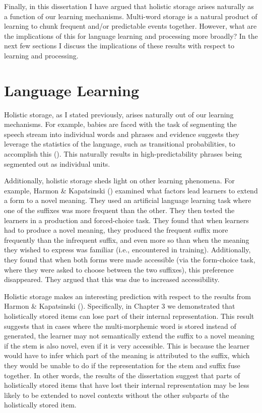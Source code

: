 \documentclass[
  12pt,
  letterpaper,
]{scrreport}
\begin{document}
Finally, in this dissertation I have argued that holistic storage arises
naturally as a function of our learning mechanisms. Multi-word storage
is a natural product of learning to chunk frequent and/or predictable
events together. However, what are the implications of this for language
learning and processing more broadly? In the next few sections I discuss
the implications of these results with respect to learning and
processing.

\section{Language Learning}\label{language-learning}

Holistic storage, as I stated previously, arises naturally out of our
learning mechanisms. For example, babies are faced with the task of
segmenting the speech stream into individual words and phrases and
evidence suggests they leverage the statistics of the language, such as
transitional probabilities, to accomplish this
(). This naturally results in high-predictability phrases being
segmented out as individual units.

Additionally, holistic storage sheds light on other learning phenomena.
For example, Harmon \& Kapatsinski
() examined what factors
lead learners to extend a form to a novel meaning. They used an
artificial language learning task where one of the suffixes was more
frequent than the other. They then tested the learners in a production
and forced-choice task. They found that when learners had to produce a
novel meaning, they produced the frequent suffix more frequently than
the infrequent suffix, and even more so than when the meaning they
wished to express was familiar (i.e., encountered in training).
Additionally, they found that when both forms were made accessible (via
the form-choice task, where they were asked to choose between the two
suffixes), this preference disappeared. They argued that this was due to
increased accessibility.

Holistic storage makes an interesting prediction with respect to the
results from Harmon \& Kapatsinski
(). Specifically, in
Chapter 3 we demonstrated that holistically stored items can lose part
of their internal representation. This result suggests that in cases
where the multi-morphemic word is stored instead of generated, the
learner may not semantically extend the suffix to a novel meaning if the
stem is also novel, even if it is very accessible. This is because the
learner would have to infer which part of the meaning is attributed to
the suffix, which they would be unable to do if the representation for
the stem and suffix fuse together. In other words, the results of the
dissertation suggest that parts of holistically stored items that have
lost their internal representation may be less likely to be extended to
novel contexts without the other subparts of the holistically stored
item.
\end{document}
